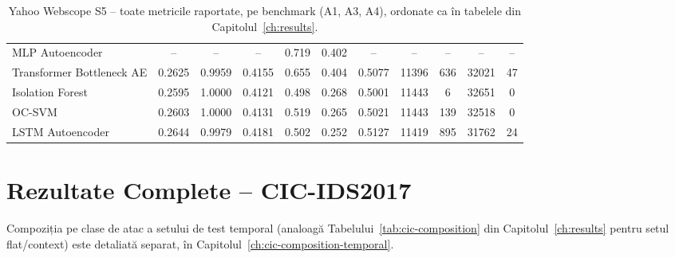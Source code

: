 \begin{table}[H]
{\begin{tabular}{@{}lcccccccccc@{}}
MLP Autoencoder            & -- & -- & -- & 0.719 & 0.402 & -- & -- & -- & -- & -- \\
Transformer Bottleneck AE  & 0.2625 & 0.9959 & 0.4155 & 0.655 & 0.404 & 0.5077 & 11396 & 636 & 32021 & 47 \\
Isolation Forest           & 0.2595 & 1.0000 & 0.4121 & 0.498 & 0.268 & 0.5001 & 11443 & 6 & 32651 & 0 \\
OC-SVM                     & 0.2603 & 1.0000 & 0.4131 & 0.519 & 0.265 & 0.5021 & 11443 & 139 & 32518 & 0 \\
LSTM Autoencoder           & 0.2644 & 0.9979 & 0.4181 & 0.502 & 0.252 & 0.5127 & 11419 & 895 & 31762 & 24 \\
\bottomrule
\end{tabular}%
}
\caption{Yahoo Webscope S5 -- toate metricile raportate, pe benchmark (A1, A3, A4), ordonate ca în tabelele din Capitolul~\ref{ch:results}.}
\label{tab:eval-full-yahoo}
\end{table}

\section{Rezultate Complete -- CIC-IDS2017}
\label{sec:eval-full-cic}

Compoziția pe clase de atac a setului de test temporal (analoagă Tabelului~\ref{tab:cic-composition} din Capitolul~\ref{ch:results} pentru setul flat/context) este detaliată separat, în Capitolul~\ref{ch:cic-composition-temporal}.

